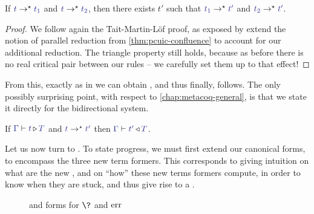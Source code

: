 \begin{lemma}
  \label{thm:ccic-confluence}
  If $\tcol{t} \red \tcol{t_1}$ and $\tcol{t} \red \tcol{t_2}$,
  then there exists $t'$ such that $\tcol{t_1} \red \tcol{t'}$ and $\tcol{t_2} \red \tcol{t'}$.
\end{lemma}

\begin{proof}

  We follow again the Tait-Martin-Löf proof, as exposed by  extend the notion of parallel reduction from \cref{thm:pcuic-confluence}
  to account for our additional reduction. The triangle property still holds,
  because as before there is no real critical pair between our rules – we carefully set
  them up to that effect!
  
\end{proof}

From this, exactly as in  we can obtain ,
and thus finally,  follows. The only possibly surprising point,
with respect to \cref{chap:metacoq-general}, is that we state it directly for the bidirectional
system.

\begin{theorem}
  If $\cinferty{\Gamma}{t}{T}$ and $\tcol{t} \red \tcol{t'}$ then $\ccheckty{\Gamma}{t'}{T}$.
\end{theorem}

Let us now turn to .
To state progress, we must first extend our canonical forms, to encompass the three new
term formers. This corresponds to giving intuition on what are the new ,
and on “how” these new terms formers compute, in order to know when they are stuck, and thus
give rise to a .

\begin{figure}[h]
  \ContinuedFloat*
  \caption{ and  forms for $\?$ and $\err$}
  \label{fig:ccic-nor-exc}
\end{figure}

